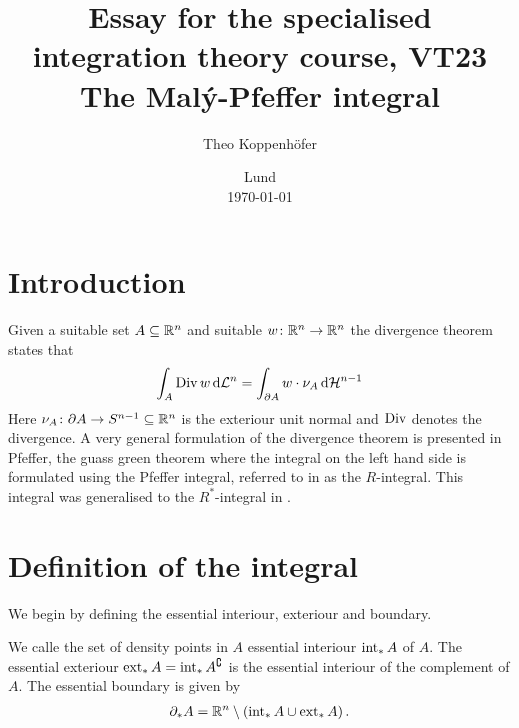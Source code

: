 




\title{ Essay for the specialised integration theory course, VT23 \\[1ex]
	  \large The Malý-Pfeffer integral}
\author{Theo Koppenhöfer}
\date{Lund \\[1ex] \today}







\maketitle

\section{Introduction}

Given a suitable set $A\subseteq\mathbb{R}^n$ and suitable $w\colon\mathbb{R}^n\to\mathbb{R}^n$ the divergence theorem states that
\begin{align*}
	\int_A\operatorname{Div} w\,\mathrm{d} \mathcal{L}^n=\int_{\partial A}w\cdot\nu_A\,\mathrm{d} \mathcal{H}^{n-1}
\end{align*}
Here $\nu_A\colon \partial A\to S^{n-1}\subseteq\mathbb{R}^n$ is the exteriour unit normal and $\operatorname{Div}$ denotes the divergence. A very general formulation of the divergence theorem is presented in Pfeffer, the guass green theorem where the integral on the left hand side is formulated using the Pfeffer integral, referred to in \cite{Pfe2016} as the $R$-integral. This integral was generalised to the $R^*$-integral in \cite{Pfe2016}.

\section{Definition of the integral}

We begin by defining the essential interiour, exteriour and boundary.

\begin{definition}
We calle the set of density points in $A$ essential interiour $\operatorname{int}_*A$ of $A$.
The essential exteriour $\operatorname{ext}_*A=\operatorname{int}_*A^\complement$ is the essential interiour of the complement of $A$. The essential boundary is given by
\begin{align*}
	\partial_*A=\mathbb{R}^n\setminus(\operatorname{int}_*A\cup\operatorname{ext}_*A)\,.
\end{align*}
\end{definition}

